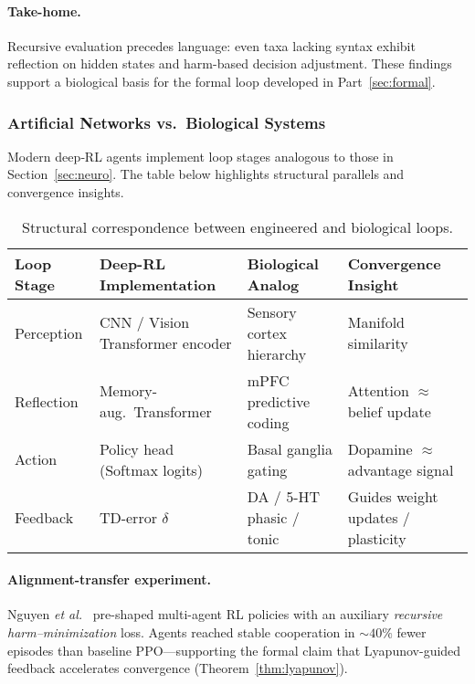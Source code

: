 \paragraph{Take-home.}
Recursive evaluation precedes language:
even taxa lacking syntax exhibit reflection on hidden states
and harm-based decision adjustment.
These findings support a biological basis for the formal loop developed
in Part~\ref{sec:formal}.

\subsubsection{Artificial Networks vs.\ Biological Systems}
\label{sec:ai-bio}

Modern deep‐RL agents implement loop stages analogous to those
in Section~\ref{sec:neuro}.  
The table below highlights structural parallels and convergence insights.

\begin{table}[htbp!]
\centering
\renewcommand{\arraystretch}{1.2}
\begin{tabular}{@{}llll@{}}
\toprule
\textbf{Loop Stage} &
\textbf{Deep-RL Implementation} &
\textbf{Biological Analog} &
\textbf{Convergence Insight} \\
\midrule
Perception &
CNN / Vision Transformer encoder &
Sensory cortex hierarchy &
Manifold similarity \cite{Cichy2019DeepNNsModels} \\
Reflection &
Memory-aug.\ Transformer &
mPFC predictive coding &
Attention $\approx$ belief update \\
Action &
Policy head (Softmax logits) &
Basal ganglia gating &
Dopamine $\approx$ advantage signal \\
Feedback &
TD-error $\delta$ &
DA / 5-HT phasic / tonic &
Guides weight updates / plasticity \\
\bottomrule
\end{tabular}
\caption{Structural correspondence between engineered and biological loops.}
\label{tab:ai-bio}
\end{table}

\paragraph{Alignment-transfer experiment.}
Nguyen \emph{et al.}\ \cite{Nguyen2024RecursiveHarmMARL} pre-shaped multi-agent RL policies
with an auxiliary \textit{recursive harm–minimization} loss.
Agents reached stable cooperation in ${\sim}40\%$ fewer episodes than
baseline PPO---supporting the formal claim that Lyapunov-guided feedback
accelerates convergence (Theorem~\ref{thm:lyapunov}).

